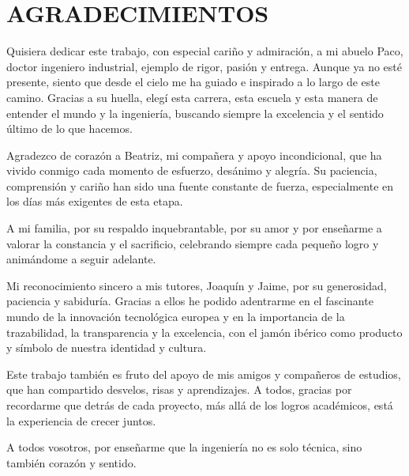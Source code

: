 \chapter*{AGRADECIMIENTOS}

Quisiera dedicar este trabajo, con especial cariño y admiración, a mi abuelo Paco, doctor ingeniero industrial, ejemplo de rigor, pasión y entrega. Aunque ya no esté presente, siento que desde el cielo me ha guiado e inspirado a lo largo de este camino. Gracias a su huella, elegí esta carrera, esta escuela y esta manera de entender el mundo y la ingeniería, buscando siempre la excelencia y el sentido último de lo que hacemos.

Agradezco de corazón a Beatriz, mi compañera y apoyo incondicional, que ha vivido conmigo cada momento de esfuerzo, desánimo y alegría. Su paciencia, comprensión y cariño han sido una fuente constante de fuerza, especialmente en los días más exigentes de esta etapa.

A mi familia, por su respaldo inquebrantable, por su amor y por enseñarme a valorar la constancia y el sacrificio, celebrando siempre cada pequeño logro y animándome a seguir adelante.

Mi reconocimiento sincero a mis tutores, Joaquín y Jaime, por su generosidad, paciencia y sabiduría. Gracias a ellos he podido adentrarme en el fascinante mundo de la innovación tecnológica europea y en la importancia de la trazabilidad, la transparencia y la excelencia, con el jamón ibérico como producto y símbolo de nuestra identidad y cultura.

Este trabajo también es fruto del apoyo de mis amigos y compañeros de estudios, que han compartido desvelos, risas y aprendizajes. A todos, gracias por recordarme que detrás de cada proyecto, más allá de los logros académicos, está la experiencia de crecer juntos.

A todos vosotros, por enseñarme que la ingeniería no es solo técnica, sino también corazón y sentido.
